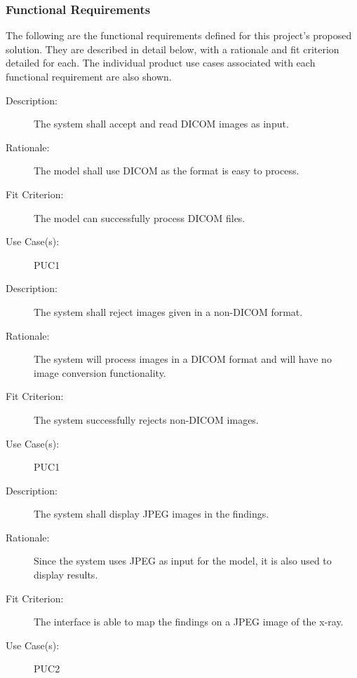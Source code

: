 \documentclass[12pt]{article}
\begin{document}
\subsubsection{Functional Requirements}
The following are the functional requirements defined for this project's proposed solution. They are described in detail below, with a rationale and fit criterion detailed for each. The individual product use cases associated with each functional requirement are also shown.
\begin{enumerate}[label=FR\arabic*., series=frs]
    \begin{item}
        \begin{description}
            \item[Description:] The system shall accept and read DICOM images as input.
            \item[Rationale:] The model shall use DICOM as the format is easy to process.
            \item[Fit Criterion:] The model can successfully process DICOM files.
            \item[Use Case(s):] PUC1
        \end{description}
    \end{item}
    \begin{item}
        \begin{description}
            \item[Description:] The system shall reject images given in a non-DICOM format.
            \item[Rationale:] The system will process images in a DICOM format and will have no image conversion functionality.
            \item[Fit Criterion:] The system successfully rejects non-DICOM images.
            \item[Use Case(s):] PUC1
        \end{description}
    \end{item}
    \begin{item}
        \begin{description}
            \item[Description:] The system shall display JPEG images in the findings.
            \item[Rationale:] Since the system uses JPEG as input for the model, it is also used to display results.
            \item[Fit Criterion:] The interface is able to map the findings on a JPEG image of the x-ray.
            \item[Use Case(s):] PUC2

\end{description}
\end{item}
\end{enumerate}
\end{document}
